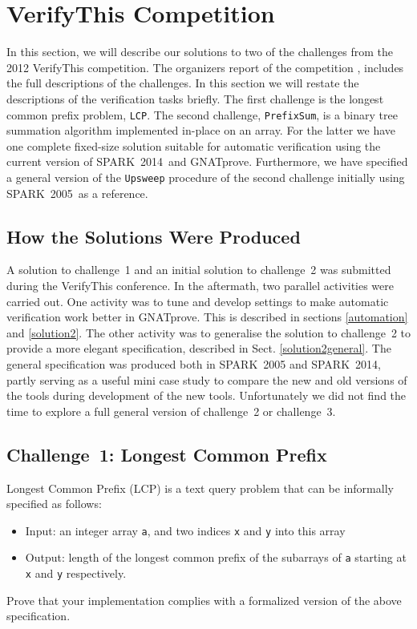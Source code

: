 \documentclass[sttt,final]{svjour}
\newcommand{\gnatprove}{GNATprove\xspace}
\newcommand{\oldspark}{SPARK~2005\xspace}
\newcommand{\newspark}{SPARK~2014\xspace}
\begin{document}
\section{VerifyThis Competition}
\label{verifythis}
In this section, we will describe our solutions to two of the challenges
from the 2012 VerifyThis competition. The organizers report of the
competition \cite {verifythis2012}, includes the full descriptions of the
challenges. In this section we will restate the descriptions of the
verification tasks briefly. The first challenge is the longest common
prefix problem, \verb|LCP|. The second challenge, \verb|PrefixSum|, is a
binary tree summation algorithm implemented in-place on an array. For the
latter we have one complete fixed-size solution suitable for automatic
verification using the current version of \newspark\ and
\gnatprove. Furthermore, we have specified a general version of the
\verb|Upsweep| procedure of the second challenge initially using
\oldspark\ as a reference.

\subsection{How the Solutions Were Produced}
A solution to challenge~1 and an initial solution to challenge~2 was
submitted during the VerifyThis conference. In the aftermath, two
parallel activities were carried out. One activity was to tune and
develop settings to make automatic verification work better in
\gnatprove. This is described in sections \ref {automation} and
\ref{solution2}. The other activity was to generalise the solution to
challenge~2 to provide a more elegant specification, described in
Sect. \ref{solution2general}. The general specification was produced
both in \oldspark and \newspark, partly serving as a useful mini case
study to compare the new and old versions of the tools during
development of the new tools. Unfortunately we did not find the time
to explore a full general version of challenge~2 or challenge~3.

\subsection{Challenge~1: Longest Common Prefix}
Longest Common Prefix (LCP) is a text query problem that can be
informally specified as follows:

\begin{itemize}
\item Input: an integer array \verb|a|, and two indices \verb|x| and
  \verb|y| into this array
\item Output: length of the longest common prefix of the subarrays of
  \verb|a| starting at \verb|x| and \verb|y| respectively.
\end{itemize}
%
Prove that your implementation complies with a formalized
version of the above specification.
\end{document}
